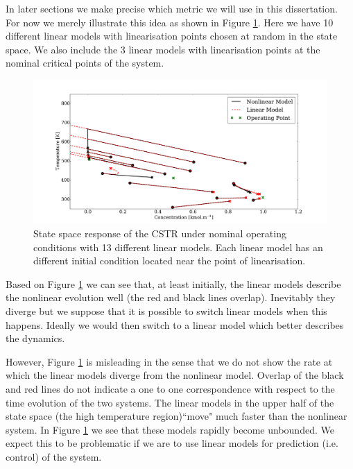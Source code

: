 \documentclass[../masters.tex]{subfiles}
\begin{document}
In later sections we make precise which metric we will use in this dissertation. For now we merely illustrate this idea as shown in Figure \ref{fig_cstr_many}. Here we have 10 different linear models with linearisation points chosen at random in the state space. We also include the 3 linear models with linearisation points at the nominal critical points of the system. 
\begin{figure}[H] 
\centering
\includegraphics[scale=0.3]{cstr_lin_many.pdf}
\caption{State space response of the CSTR under nominal operating conditions with 13 different linear models. Each linear model has an different initial condition located near the point of linearisation.}
\label{fig_cstr_many}
\end{figure}
Based on Figure \ref{fig_cstr_many} we can see that, at least initially, the linear models describe the nonlinear evolution well (the red and black lines overlap). Inevitably they diverge but we suppose that it is possible to switch linear models when this happens. Ideally we would then switch to a linear model which better describes the dynamics. 

However, Figure \ref{fig_cstr_many} is misleading in the sense that we do not show the rate at which the linear models diverge from the nonlinear model. Overlap of the black and red lines do not indicate a one to one correspondence with respect to the time evolution of the two systems. The linear models in the upper half of the state space (the high temperature region)``move" much faster than the nonlinear system. In Figure \ref{fig_cstr_many} we see that these models rapidly become unbounded. We expect this to be problematic if we are to use linear models for prediction (i.e. control) of the system.
\end{document}

